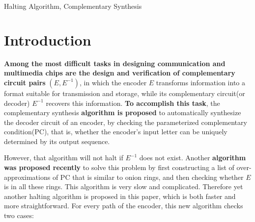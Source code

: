 \documentclass[journal]{IEEEtran}
\begin{document}
\begin{IEEEkeywords}
Halting Algorithm, Complementary Synthesis
\end{IEEEkeywords}






%
\IEEEpeerreviewmaketitle


\newtheorem{algo}{\textbf{Algorithm}}
\newtheorem{definition11}{\textbf{Definition}}
\newtheorem{lemma}{\textbf{Lemma}}
\newtheorem{theorem}{\textbf{Theorem}}
\newtheorem{proposition}{\textbf{Proposition}}

\section{Introduction}\label{sec_intro}
\textbf{Among the most difficult tasks in designing communication
and multimedia chips
are the design and verification of complementary circuit pairs} $(E, E^{-1})$,
in which the encoder $E$ transforms information into a format suitable for transmission and storage,
while its complementary circuit(or decoder) $E^{-1}$ recovers this information.
\textbf{To accomplish this task},
the complementary synthesis \textbf{algorithm is proposed} \cite{ShengYuShen:iccad09,ShengYuShen:tcad}
to automatically synthesize the decoder circuit of an encoder,
by checking the parameterized complementary condition(PC),
that is,
whether the encoder's input letter can be uniquely determined by its output sequence.

However,
that algorithm will not halt if $E^{-1}$ does not exist.
Another \textbf{algorithm was proposed recently} \cite{ShengYuShen:fmcad10} to solve this problem
by first constructing a list of over-approximations of PC that is similar to onion rings,
and then checking whether $E$ is in all these rings.
This algorithm is very slow and complicated.
Therefore yet another halting algorithm is proposed in this paper,
which is both faster and more straightforward.
For every path of the encoder,
this new algorithm checks two cases:
\end{document}
